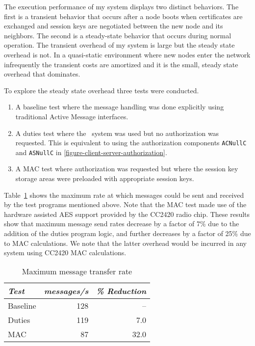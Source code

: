 The execution performance of my system displays two distinct behaviors. The first is a transient
behavior that occurs after a node boots when certificates are exchanged and session keys are
negotiated between the new node and its neighbors. The second is a steady-state behavior that
occurs during normal operation. The transient overhead of my system is large but the steady
state overhead is not. In a quasi-static environment where new nodes enter the network
infrequently the transient costs are amortized and it is the small, steady state overhead that
dominates.

To explore the steady state overhead three tests were conducted.
\begin{enumerate}
\item A baseline test where the message handling was done explicitly using traditional Active
  Message interfaces.
\item A duties test where the \Sprocket\ system was used but no authorization was requested.
  This is equivalent to using the authorization components \texttt{ACNullC} and \texttt{ASNullC}
  in \autoref{figure-client-server-authorization}.
\item A MAC test where authorization was requested but where the session key storage areas were
  preloaded with appropriate session keys.
\end{enumerate}

Table~\ref{table-steady-state} shows the maximum rate at which messages could be sent and
received by the test programs mentioned above. Note that the MAC test made use of the hardware
assisted AES support provided by the CC2420 radio chip. These results show that maximum message
send rates decrease by a factor of 7\% due to the addition of the duties program logic, and
further decreases by a factor of 25\% due to MAC calculations. We note that the latter overhead
would be incurred in any system using CC2420 MAC calculations.

\begin{table}[!t]
  \newcommand\T{\rule{0pt}{2.1ex}}
  \centering
  \caption{Maximum message transfer rate}
  {
  \begin{tabular}{|l|r|r|} \hline
    \textit{Test} \T & \textit{messages/s} & \textit{\% Reduction} \\
    \hline \hline

    Baseline \T & 128 &   -- \\ \hline 
    Duties   \T & 119 &  7.0 \\ \hline
    MAC      \T &  87 & 32.0 \\ \hline
  \end{tabular}
  }
  \label{table-steady-state}
\end{table}

